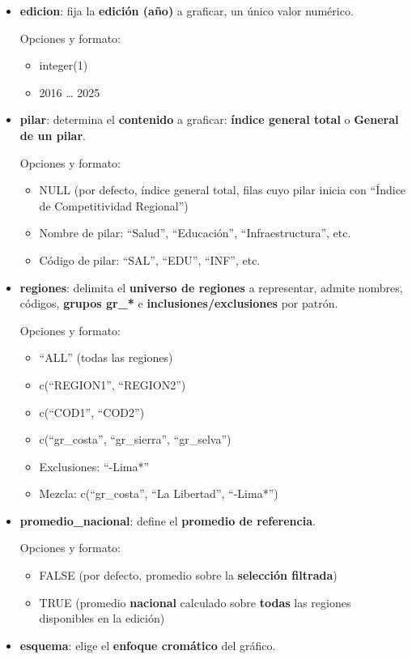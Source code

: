 \documentclass[
  11pt,
  letterpaper,
  DIV=11,
  numbers=noendperiod]{scrartcl}
\begin{document}
\begin{itemize}
\item
  \textbf{edicion}: fija la \textbf{edición (año)} a graficar, un único
  valor numérico.

  Opciones y formato:

  \begin{itemize}
  \item
    integer(1)
  \item
    2016 \ldots{} 2025
  \end{itemize}
\item
  \textbf{pilar}: determina el \textbf{contenido} a graficar:
  \textbf{índice general total} o \textbf{General de un pilar}.

  Opciones y formato:

  \begin{itemize}
  \item
    NULL (por defecto, índice general total, filas cuyo pilar inicia con
    ``Índice de Competitividad Regional'')
  \item
    Nombre de pilar: ``Salud'', ``Educación'', ``Infraestructura'', etc.
  \item
    Código de pilar: ``SAL'', ``EDU'', ``INF'', etc.
  \end{itemize}
\item
  \textbf{regiones}: delimita el \textbf{universo de regiones} a
  representar, admite nombres, códigos, \textbf{grupos gr\_*} e
  \textbf{inclusiones/exclusiones} por patrón.

  Opciones y formato:

  \begin{itemize}
  \item
    ``ALL'' (todas las regiones)
  \item
    c(``REGION1'', ``REGION2'')
  \item
    c(``COD1'', ``COD2'')
  \item
    c(``gr\_costa'', ``gr\_sierra'', ``gr\_selva'')
  \item
    Exclusiones: ``-Lima*''
  \item
    Mezcla: c(``gr\_costa'', ``La Libertad'', ``-Lima*'')
  \end{itemize}
\item
  \textbf{promedio\_nacional}: define el \textbf{promedio de
  referencia}.

  Opciones y formato:

  \begin{itemize}
  \item
    FALSE (por defecto, promedio sobre la \textbf{selección filtrada})
  \item
    TRUE (promedio \textbf{nacional} calculado sobre \textbf{todas} las
    regiones disponibles en la edición)
  \end{itemize}
\item
  \textbf{esquema}: elige el \textbf{enfoque cromático} del gráfico.


\end{itemize}
\end{document}
